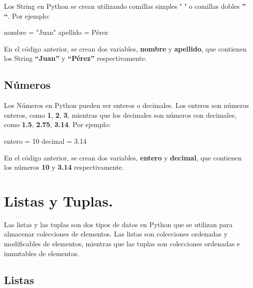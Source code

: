 \documentclass[
  a4paper,
  DIV=11,
  numbers=noendperiod,
  onepage,
  openany]{scrreprt}
\newenvironment{Shaded}{\begin{snugshade}}{\end{snugshade}}
\newcommand{\DecValTok}[1]{\textcolor[rgb]{0.68,0.00,0.00}{#1}}
\newcommand{\FloatTok}[1]{\textcolor[rgb]{0.68,0.00,0.00}{#1}}
\newcommand{\NormalTok}[1]{\textcolor[rgb]{0.00,0.23,0.31}{#1}}
\newcommand{\OperatorTok}[1]{\textcolor[rgb]{0.37,0.37,0.37}{#1}}
\newcommand{\StringTok}[1]{\textcolor[rgb]{0.13,0.47,0.30}{#1}}
\begin{document}
Los String en Python se crean utilizando comillas simples \textbf{' '} o
comillas dobles \textbf{'' ``}. Por ejemplo:

\begin{Shaded}
\begin{Highlighting}[]
\NormalTok{nombre }\OperatorTok{=} \StringTok{"Juan"}
\NormalTok{apellido }\OperatorTok{=} \StringTok{\textquotesingle{}Pérez\textquotesingle{}}
\end{Highlighting}
\end{Shaded}

En el código anterior, se crean dos variables, \textbf{nombre} y
\textbf{apellido}, que contienen los String \textbf{``Juan''} y
\textbf{``Pérez''} respectivamente.

\subsection{Números}\label{nuxfameros}

Los Números en Python pueden ser enteros o decimales. Los enteros son
números enteros, como \textbf{1}, \textbf{2}, \textbf{3}, mientras que
los decimales son números con decimales, como \textbf{1.5},
\textbf{2.75}, \textbf{3.14}. Por ejemplo:

\begin{Shaded}
\begin{Highlighting}[]
\NormalTok{entero }\OperatorTok{=} \DecValTok{10}
\NormalTok{decimal }\OperatorTok{=} \FloatTok{3.14}
\end{Highlighting}
\end{Shaded}

En el código anterior, se crean dos variables, \textbf{entero} y
\textbf{decimal}, que contienen los números \textbf{10} y \textbf{3.14}
respectivamente.

\section{Listas y Tuplas.}\label{listas-y-tuplas.}

Las listas y las tuplas son dos tipos de datos en Python que se utilizan
para almacenar colecciones de elementos. Las listas son colecciones
ordenadas y modificables de elementos, mientras que las tuplas son
colecciones ordenadas e inmutables de elementos.

\subsection{Listas}\label{listas}
\end{document}
